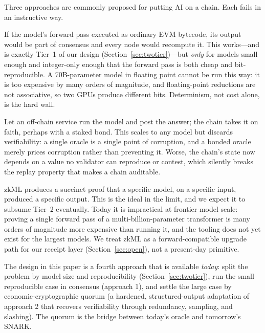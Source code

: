 Three approaches are commonly proposed for putting AI on a chain. Each fails in an instructive way.

\begin{description}[style=nextline,leftmargin=0pt]
\item[\textnormal{(1) Run the model in the EVM.}] If the model's forward pass executed as ordinary EVM bytecode, its output would be part of consensus and every node would recompute it. This works---and is exactly Tier~1 of our design (Section~\ref{sec:twotier})---but \emph{only} for models small enough and integer-only enough that the forward pass is both cheap and bit-reproducible. A 70B-parameter model in floating point cannot be run this way: it is too expensive by many orders of magnitude, and floating-point reductions are not associative, so two GPUs produce different bits. Determinism, not cost alone, is the hard wall.

\item[\textnormal{(2) Trust an oracle.}] Let an off-chain service run the model and post the answer; the chain takes it on faith, perhaps with a staked bond. This scales to any model but discards verifiability: a single oracle is a single point of corruption, and a bonded oracle merely prices corruption rather than preventing it. Worse, the chain's state now depends on a value no validator can reproduce or contest, which silently breaks the replay property that makes a chain auditable.

\item[\textnormal{(3) Prove the inference with a SNARK.}] zkML \cite{zkml-survey} produces a succinct proof that a specific model, on a specific input, produced a specific output. This is the ideal in the limit, and we expect it to subsume Tier~2 eventually. Today it is impractical at frontier-model scale: proving a single forward pass of a multi-billion-parameter transformer is many orders of magnitude more expensive than running it, and the tooling does not yet exist for the largest models. We treat zkML as a forward-compatible upgrade path for our receipt layer (Section~\ref{sec:open}), not a present-day primitive.
\end{description}

The design in this paper is a fourth approach that is available \emph{today}: split the problem by model size and reproducibility (Section~\ref{sec:twotier}), run the small reproducible case in consensus (approach 1), and settle the large case by economic-cryptographic quorum (a hardened, structured-output adaptation of approach 2 that recovers verifiability through redundancy, sampling, and slashing). The quorum is the bridge between today's oracle and tomorrow's SNARK.

